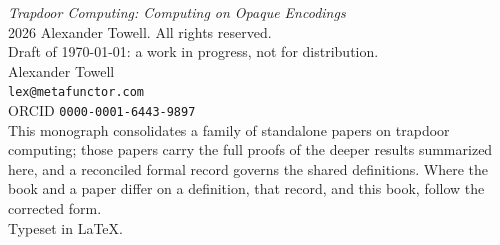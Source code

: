 \thispagestyle{empty}
\vspace*{\fill}
\noindent
\textit{Trapdoor Computing: Computing on Opaque Encodings}\\[0.4em]
\textcopyright{} 2026 Alexander Towell. All rights reserved.\\[0.9em]
Draft of \today{}: a work in progress, not for distribution.\\[0.9em]
\noindent
Alexander Towell\\
\texttt{lex@metafunctor.com}\\
ORCID \texttt{0000-0001-6443-9897}\\[0.9em]
\noindent
This monograph consolidates a family of standalone papers on trapdoor
computing; those papers carry the full proofs of the deeper results
summarized here, and a reconciled formal record governs the shared
definitions. Where the book and a paper differ on a definition, that record,
and this book, follow the corrected form.\\[0.9em]
\noindent
Typeset in \LaTeX{}.
\vspace*{\fill}
